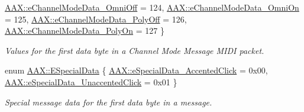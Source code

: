 \begin{DoxyCompactItemize}
\hyperlink{a00288_a51c6649733dc2e7ce2364c7b52ddf461a5e2dba641939d400e47d9320b0db306a}{A\+A\+X\+::e\+Channel\+Mode\+Data\+\_\+\+Omni\+Off} = 124, 
\hyperlink{a00288_a51c6649733dc2e7ce2364c7b52ddf461a3defca7d2a1dc6940bbc00a14eadd2d0}{A\+A\+X\+::e\+Channel\+Mode\+Data\+\_\+\+Omni\+On} = 125, 
\hyperlink{a00288_a51c6649733dc2e7ce2364c7b52ddf461ac2819c2b9eeec76609fa42609b2fd878}{A\+A\+X\+::e\+Channel\+Mode\+Data\+\_\+\+Poly\+Off} = 126, 
\hyperlink{a00288_a51c6649733dc2e7ce2364c7b52ddf461ada14fa008d32a84173ed0f0e9d416a49}{A\+A\+X\+::e\+Channel\+Mode\+Data\+\_\+\+Poly\+On} = 127
 \}
\begin{DoxyCompactList}\small\item\em Values for the first data byte in a Channel Mode Message M\+I\+D\+I packet. \end{DoxyCompactList}\item 
enum \hyperlink{a00288_a6884ba464f3e76eb758d45daf1395199}{A\+A\+X\+::\+E\+Special\+Data} \{ \hyperlink{a00288_a6884ba464f3e76eb758d45daf1395199a52061b5587075953631c1389016cb0cf}{A\+A\+X\+::e\+Special\+Data\+\_\+\+Accented\+Click} = 0x00, 
\hyperlink{a00288_a6884ba464f3e76eb758d45daf1395199a35a276fca410721fc1c39adb01be7af3}{A\+A\+X\+::e\+Special\+Data\+\_\+\+Unaccented\+Click} = 0x01
 \}
\begin{DoxyCompactList}\small\item\em Special message data for the first data byte in a message. \end{DoxyCompactList}\end{DoxyCompactItemize}
